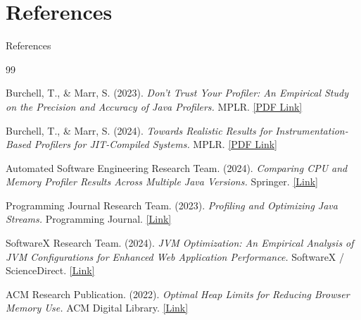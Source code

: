 \documentclass[aspectratio=169]{beamer}
\begin{document}
\section{References}
\begin{frame}[allowframebreaks]{References}
\small
\begin{thebibliography}{99}

Burchell, T., \& Marr, S. (2023).
\textit{Don't Trust Your Profiler: An Empirical Study on the Precision and Accuracy of Java Profilers.}
MPLR.
\href{https://stefan-marr.de/downloads/mplr23-burchell-et-al-dont-trust-your-profiler.pdf}{[PDF Link]}

Burchell, T., \& Marr, S. (2024).
\textit{Towards Realistic Results for Instrumentation-Based Profilers for JIT-Compiled Systems.}
MPLR.
\href{https://stefan-marr.de/downloads/mplr24-burchell-et-al-towards-realistic-results-for-instrumentation-based-profilers-for-jit-compiled-systems.pdf}{[PDF Link]}

Automated Software Engineering Research Team. (2024).
\textit{Comparing CPU and Memory Profiler Results Across Multiple Java Versions.}
Springer.
\href{https://link.springer.com/article/10.1007/s10515-024-00423-2}{[Link]}

Programming Journal Research Team. (2023).
\textit{Profiling and Optimizing Java Streams.}
Programming Journal.
\href{https://programming-journal.org/2023/7/10/}{[Link]}

SoftwareX Research Team. (2024).
\textit{JVM Optimization: An Empirical Analysis of JVM Configurations for Enhanced Web Application Performance.}
SoftwareX / ScienceDirect.
\href{https://www.sciencedirect.com/science/article/pii/S2352711024003030}{[Link]}

ACM Research Publication. (2022).
\textit{Optimal Heap Limits for Reducing Browser Memory Use.}
ACM Digital Library.
\href{https://dl.acm.org/doi/epdf/10.1145/3563323}{[Link]}

\end{thebibliography}
\end{frame}
\end{document}
